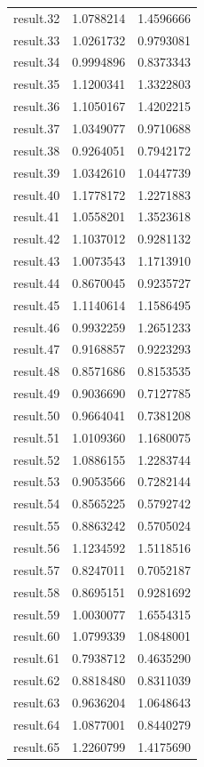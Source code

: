 \documentclass[
  letterpaper,
  DIV=11,
  numbers=noendperiod]{scrreprt}
\begin{document}
\begin{longtable}[]{@{}lrr@{}}
result.32 & 1.0788214 & 1.4596666 \\
result.33 & 1.0261732 & 0.9793081 \\
result.34 & 0.9994896 & 0.8373343 \\
result.35 & 1.1200341 & 1.3322803 \\
result.36 & 1.1050167 & 1.4202215 \\
result.37 & 1.0349077 & 0.9710688 \\
result.38 & 0.9264051 & 0.7942172 \\
result.39 & 1.0342610 & 1.0447739 \\
result.40 & 1.1778172 & 1.2271883 \\
result.41 & 1.0558201 & 1.3523618 \\
result.42 & 1.1037012 & 0.9281132 \\
result.43 & 1.0073543 & 1.1713910 \\
result.44 & 0.8670045 & 0.9235727 \\
result.45 & 1.1140614 & 1.1586495 \\
result.46 & 0.9932259 & 1.2651233 \\
result.47 & 0.9168857 & 0.9223293 \\
result.48 & 0.8571686 & 0.8153535 \\
result.49 & 0.9036690 & 0.7127785 \\
result.50 & 0.9664041 & 0.7381208 \\
result.51 & 1.0109360 & 1.1680075 \\
result.52 & 1.0886155 & 1.2283744 \\
result.53 & 0.9053566 & 0.7282144 \\
result.54 & 0.8565225 & 0.5792742 \\
result.55 & 0.8863242 & 0.5705024 \\
result.56 & 1.1234592 & 1.5118516 \\
result.57 & 0.8247011 & 0.7052187 \\
result.58 & 0.8695151 & 0.9281692 \\
result.59 & 1.0030077 & 1.6554315 \\
result.60 & 1.0799339 & 1.0848001 \\
result.61 & 0.7938712 & 0.4635290 \\
result.62 & 0.8818480 & 0.8311039 \\
result.63 & 0.9636204 & 1.0648643 \\
result.64 & 1.0877001 & 0.8440279 \\
result.65 & 1.2260799 & 1.4175690 \\

\end{longtable}
\end{document}
